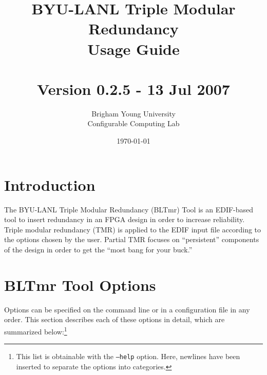 \documentclass[english]{article}
\title{BYU-LANL Triple Modular Redundancy \\ Usage Guide \\ ~ \\
  Version 0.2.5 - 13 Jul 2007}
\author{Brigham Young University \\ Configurable Computing Lab}
\date{\today}
\begin{document}
\maketitle

\newpage
\tableofcontents
\newpage

\section{Introduction}
The BYU-LANL Triple Modular Redundancy (BLTmr) Tool is an EDIF-based tool to 
insert redundancy in an FPGA design in order to increase reliability. Triple 
modular redundancy (TMR) is applied to the EDIF input file according to the 
options chosen by the user. Partial TMR focuses on ``persistent'' components of 
the design in order to get the ``most bang for your buck.''

\section{BLTmr Tool Options}
Options can be specified on the command line or in a configuration file in any 
order. This section describes each of these options in detail, which are 
summarized below:\footnote{This list is obtainable with the \texttt{--help} 
option. Here, newlines have been inserted to separate the options into 
categories.}
\end{document}
